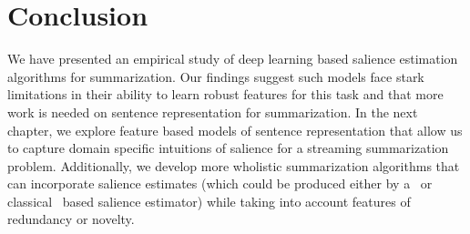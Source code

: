 \section{Conclusion}
We have presented an empirical study of deep learning based salience 
estimation
algorithms for summarization. Our findings suggest such models face stark limitations in their ability to learn robust features for this task and that 
more work is needed on sentence representation for summarization.
In the next chapter, we explore feature based models of sentence 
representation that allow us to capture domain specific intuitions 
of salience
for a streaming summarization problem. Additionally, we develop more wholistic 
summarization algorithms that can incorporate  salience estimates (which
could be produced  either
by a \deeplearning~or classical \machinelearning~based salience estimator)
while taking into account features of redundancy or novelty. 


